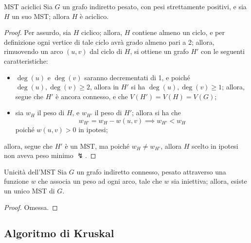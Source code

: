 \documentclass[a4paper, 12pt]{report}
\begin{document}
    \begin{framedlem}[label={lemma mst}]{MST aciclici}
        Sia $G$ un grafo indiretto pesato, con pesi strettamente positivi, e sia $H$ un suo MST; allora $H$ è aciclico.
    \end{framedlem}

    \begin{proof}
        Per assurdo, sia $H$ ciclico; allora, $H$ contiene almeno un ciclo, e per definizione ogni vertice di tale ciclo avrà grado almeno pari a 2; allora, rimuovendo un arco $(u, v)$ dal ciclo di $H$, si ottiene un grafo $H'$ con le seguenti caratteristiche:

        \begin{itemize}
            \item $\deg(u)$ e $\deg(v)$ saranno decrementati di 1, e poiché $\deg(u), \deg(v) \ge 2$, allora in $H'$ si ha $\deg(u), \deg(v) \ge 1$; allora, segue che $H'$ è ancora connesso, e che $V(H') = V(H) = V(G)$;
            \item sia $w_H$ il peso di $H$, e $w_{H'}$ il peso di $H'$; allora si ha che $$w_{H'} = w_H - w(u, v) \implies w_{H'} < w_H$$ poiché $w(u, v) > 0$ in ipotesi;
        \end{itemize}

        allora, segue che $H'$ è un MST, ma poiché $w_H \neq w_{H'}$, allora $H$ scelto in ipotesi non aveva peso minimo $\lightning$.
    \end{proof}

    \begin{framedlem}{Unicità dell'MST}
        Sia $G$ un grafo indiretto connesso, pesato attraverso una funzione $w$ che associa un peso ad ogni arco, tale che $w$ sia iniettiva; allora, esiste un unico MST di $G$.
    \end{framedlem}

    \begin{proof}
        Omessa.
    \end{proof}

    \subsection{Algoritmo di Kruskal}
\end{document}
